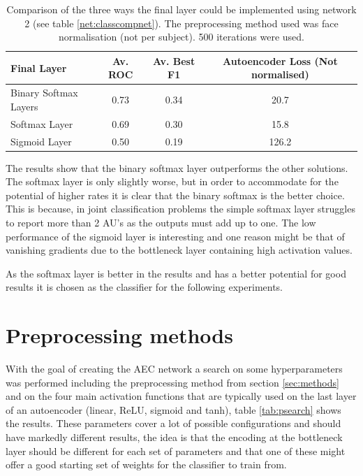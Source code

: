     \begin{table}[!h] {\footnotesize
        \centering
        \begin{tabular}{lccc}
        \hline
        Final Layer   & Av. ROC &   Av. Best F1 &   Autoencoder Loss (Not normalised) \\
        \hline
        Binary Softmax Layers  &   0.73 &  0.34 &   20.7 \\
        Softmax Layer          &   0.69 &  0.30 &   15.8 \\
        Sigmoid Layer          &   0.50 &  0.19 &  126.2 \\
        \hline
        \end{tabular}
      \caption{Comparison of the three ways the final layer could be implemented using network 2 (see table \ref{net:classcompnet}). The
      preprocessing method used was face normalisation (not per subject). 500 iterations were used. } \label{tab:binsoftcomp} }
      \end{table}

      The results show that the binary softmax layer outperforms the other solutions. The
      softmax layer is only slightly worse, but in order to accommodate for the potential of higher rates
      it is clear that the binary softmax is the better choice. This is because, in joint classification problems
      the simple softmax layer struggles to report more than 2 AU's as the outputs must add up to one.
      The low performance of the sigmoid layer is interesting and one reason might be that of vanishing gradients due to
      the bottleneck layer containing high activation values.

      As the softmax layer is better in the results and has a better potential for good results
      it is chosen as the classifier for the following experiments.

      \section{Preprocessing methods} \label{sec:psearch}

          With the goal of creating the AEC network a search on some hyperparameters was performed
          including the preprocessing method from section \ref{sec:methods} and on the four main activation functions
          that are typically used on the last layer of an autoencoder (linear, ReLU, sigmoid and tanh), table \ref{tab:psearch} shows the results.
          These parameters cover a lot of possible configurations and should have markedly different results, the idea
          is that the encoding at the bottleneck layer should be different for each set of parameters and that
          one of these might offer a good starting set of weights for the classifier to train from.

